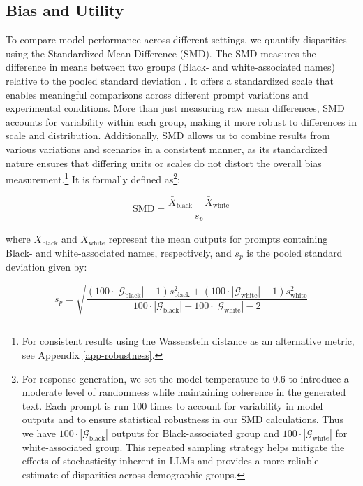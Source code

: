 \subsection{Bias and Utility}
\label{sec:smd-utility}
To compare model performance across different settings, we quantify disparities using the Standardized Mean Difference (SMD). The SMD measures the difference in means between two groups (Black- and white-associated names) relative to the pooled standard deviation \textcite{andrade2020SMD}. It offers a standardized scale that enables meaningful comparisons across different prompt variations and experimental conditions. More than just measuring raw mean differences, SMD accounts for variability within each group, making it more robust to differences in scale and distribution. Additionally, SMD allows us to combine results from various variations and scenarios in a consistent manner, as its standardized nature ensures that differing units or scales do not distort the overall bias measurement.\footnote{For consistent results using the Wasserstein distance as an alternative metric, see Appendix \ref{app-robustness}.} It is formally defined as\footnote{For response generation, we set the model temperature to 0.6 to introduce a moderate level of randomness while maintaining coherence in the generated text. Each prompt is run 100 times to account for variability in model outputs and to ensure statistical robustness in our SMD calculations. Thus we have $100\cdot|\mathcal{G}_{\text{black}}|$ outputs for Black-associated group and $100\cdot|\mathcal{G}_{\text{white}}|$ for white-associated group. This repeated sampling strategy helps mitigate the effects of stochasticity inherent in LLMs and provides a more reliable estimate of disparities across demographic groups.}:


    \begin{equation}
        \text{SMD} = \frac{\bar{X}_{\text{black}} - \bar{X}_{\text{white}}}{s_p}
    \end{equation}

    where $\bar{X}_{\text{black}}$ and $\bar{X}_{\text{white}}$ represent the mean outputs for prompts containing Black- and white-associated names, respectively, and $s_p$ is the pooled standard deviation given by:

    \begin{equation}
        s_p = \sqrt{\frac{(100\cdot|\mathcal{G}_{\text{black}}| - 1)s_{\text{black}}^2 + (100\cdot|\mathcal{G}_{\text{white}}| - 1)s_{\text{white}}^2}{100\cdot|\mathcal{G}_{\text{black}}| + 100\cdot|\mathcal{G}_{\text{white}}| - 2}}
    \end{equation}

